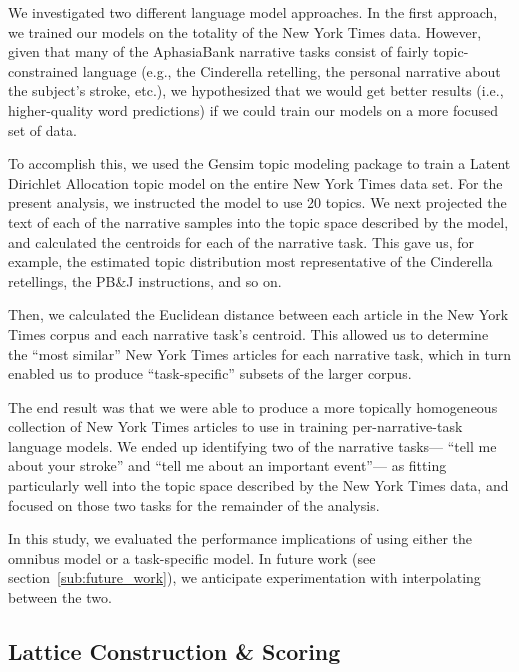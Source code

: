 We investigated two different language model approaches.
In the first approach, we trained our models on the totality of the New York Times data.
However, given that many of the AphasiaBank narrative tasks consist of fairly topic-constrained language (e.g., the Cinderella retelling, the personal narrative about the subject's stroke, etc.), we hypothesized that we would get better results (i.e., higher-quality word predictions) if we could train our models on a more focused set of data.

To accomplish this, we used the Gensim topic modeling package \cite{rehurek_lrec} to train a Latent Dirichlet Allocation topic model \cite{Blei:2003:LDA:944919.944937} on the entire New York Times data set.
For the present analysis, we instructed the model to use 20 topics.
We next projected the text of each of the narrative samples into the topic space described by the model, and calculated the centroids for each of the narrative task.
This gave us, for example, the estimated topic distribution most representative of the Cinderella retellings, the PB\&J instructions, and so on.

Then, we calculated the Euclidean distance between each article in the New York Times corpus and each narrative task's centroid.
This allowed us to determine the ``most similar'' New York Times articles for each narrative task, which in turn enabled us to produce ``task-specific'' subsets of the larger corpus.

The end result was that we were able to produce a more topically homogeneous collection of New York Times articles to use in training per-narrative-task language models.
We ended up identifying two of the narrative tasks--- ``tell me about your stroke'' and ``tell me about an important event''--- as fitting particularly well into the topic space described by the New York Times data, and focused on those two tasks for the remainder of the analysis.


In this study, we evaluated the performance implications of using either the omnibus model or a task-specific model.
In future work (see section~\ref{sub:future_work}), we anticipate experimentation with interpolating between the two.



\subsection{Lattice Construction \& Scoring} %
\label{sub:lattice_construction_scoring}

